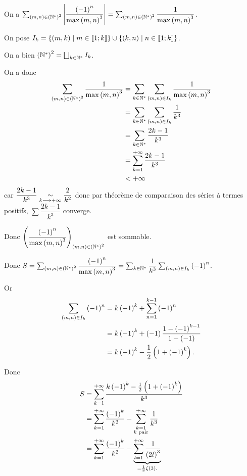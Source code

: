 \begin{corr}~\\
On a \(\sum_{\left(m,n\right)\in\left(\mathbb{N}^*\right)^2}\left\lvert\dfrac{\left(-1\right)^n}{\max\left(m,n\right)^3}\right\rvert=\sum_{\left(m,n\right)\in\left(\mathbb{N}^*\right)^2}\dfrac{1}{\max\left(m,n\right)^3}\).

On pose \(I_k=\left\lbrace\left(m,k\right)\;\middle|\; m\in\left\llbracket1;k\right\rrbracket\right\rbrace\cup\left\lbrace\left(k,n\right)\;\middle|\; n\in\left\llbracket1;k\right\rrbracket\right\rbrace\).

On a bien \(\left(\mathbb{N}^*\right)^2=\bigsqcup_{k\in\mathbb{N}^*}I_k\).

On a donc \[\begin{aligned}
\sum_{\left(m,n\right)\in\left(\mathbb{N}^*\right)^2}\dfrac{1}{\max\left(m,n\right)^3}&=\sum_{k\in\mathbb{N}^*}\sum_{\left(m,n\right)\in I_k}\dfrac{1}{\max\left(m,n\right)^3} \\
&=\sum_{k\in\mathbb{N}^*}\sum_{\left(m,n\right)\in I_k}\dfrac{1}{k^3} \\
&=\sum_{k\in\mathbb{N}^*}\dfrac{2k-1}{k^3} \\
&=\sum_{k=1}^{+\infty}\dfrac{2k-1}{k^3} \\
&<+\infty
\end{aligned}\] car \(\dfrac{2k-1}{k^3}\underset{k\longrightarrow+\infty}{\sim}\dfrac{2}{k^2}\) donc par théorème de comparaison des séries à termes positifs, \(\sum\dfrac{2k-1}{k^3}\) converge.

Donc \(\left(\dfrac{\left(-1\right)^n}{\max\left(m,n\right)^3}\right)_{\left(m,n\right)\in\left(\mathbb{N}^*\right)^2}\) est sommable.

Donc \(S=\sum_{\left(m,n\right)\in\left(\mathbb{N}^*\right)^2}\dfrac{\left(-1\right)^n}{\max\left(m,n\right)^3}=\sum_{k\in\mathbb{N}^*}\dfrac{1}{k^3}\sum_{\left(m,n\right)\in I_k}\left(-1\right)^n\).

Or \[\begin{aligned}
\sum_{\left(m,n\right)\in I_k}\left(-1\right)^n&=k\left(-1\right)^k+\sum_{n=1}^{k-1}\left(-1\right)^n \\
&=k\left(-1\right)^k+\left(-1\right)\dfrac{1-\left(-1\right)^{k-1}}{1-\left(-1\right)} \\
&=k\left(-1\right)^k-\dfrac{1}{2}\left(1+\left(-1\right)^k\right).
\end{aligned}\]

Donc \[\begin{aligned}
S&=\sum_{k=1}^{+\infty}\dfrac{k\left(-1\right)^k-\frac{1}{2}\left(1+\left(-1\right)^k\right)}{k^3} \\
&=\sum_{k=1}^{+\infty}\dfrac{\left(-1\right)^k}{k^2}-\sum_{\substack{k=1 \\ k\text{ pair}}}^{+\infty}\dfrac{1}{k^3} \\
&=\sum_{k=1}^{+\infty}\dfrac{\left(-1\right)^k}{k^2}-\underbrace{\sum_{l=1}^{+\infty}\dfrac{1}{\left(2l\right)^3}}_{=\frac{1}{8}\zeta\left(3\right).}
\end{aligned}\]


\end{corr}
